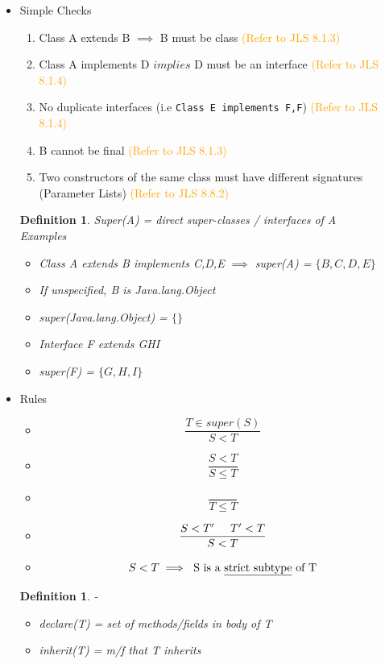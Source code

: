 \documentclass{article}
\newtheorem{definition}[theorem]{Definition}
\begin{document}
\begin{itemize}
\begin{itemize}
\item Simple Checks 
\begin{enumerate}
\item Class A extends B \(\implies\) B must be class  \textcolor{orange}{(Refer to JLS 8.1.3)}
\item Class A implements D \(implies\) D must be an interface \textcolor{orange}{(Refer to JLS 8.1.4)}
\item No duplicate interfaces (i.e \verb|Class E implements F,F|) \textcolor{orange}{(Refer to JLS 8.1.4)}
\item B cannot be final \textcolor{orange}{(Refer to JLS 8.1.3)}
\item Two constructors of the same class must have different signatures (Parameter Lists) \textcolor{orange}{(Refer to JLS 8.8.2)}
\end{enumerate}
\begin{definition} Super(A) = direct super-classes / interfaces of A\\
Examples
\begin{itemize}
\item Class A extends B implements C,D,E \(\implies\) super(A) = \(\{B, C, D, E\}\)
\item If unspecified, B is Java.lang.Object
\item super(Java.lang.Object) = \(\{\}\)
\item Interface F extends GHI 
\item super(F) = \(\{G,H, I \}\)
\end{itemize}
\end{definition}
\item Rules
\begin{itemize}
\item $$ \frac{T \in super(S)}{S < T}$$
\item $$ \frac{S < T }{S \leq T } $$
\item $$ \frac{}{T \leq T }$$
\item $$ \frac{S < T^\prime  \hspace{0.5cm} T^\prime < T }{S < T} $$
\item $$ S < T \implies \text{ S is a \underline{strict subtype} of T} $$
\end{itemize}
\begin{definition}-\\
\begin{itemize}
\item declare(T) = set of methods/fields in body of T
\item inherit(T) = m/f that T inherits 

\end{itemize}
\end{definition}
\end{itemize}
\end{itemize}
\end{document}
